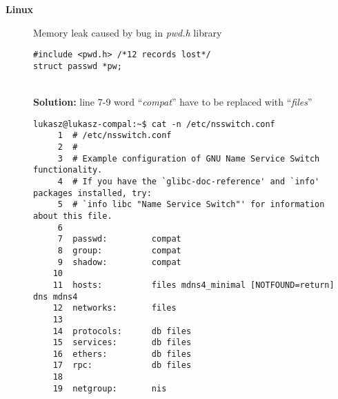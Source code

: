 \documentclass[a4paper]{article}
\begin{document}
\begin{description}
\item [{\bf Linux}] Memory leak caused by bug in {\itshape pwd.h} library
\begin{verbatim}
#include <pwd.h> /*12 records lost*/
struct passwd *pw;
\end{verbatim}
\\{\bf Solution:} line 7-9 word ``{\itshape compat}'' have to be replaced with ``{\itshape files}''
\begin{verbatim}
lukasz@lukasz-compal:~$ cat -n /etc/nsswitch.conf 
     1	# /etc/nsswitch.conf
     2	#
     3	# Example configuration of GNU Name Service Switch functionality.
     4	# If you have the `glibc-doc-reference' and `info' packages installed, try:
     5	# `info libc "Name Service Switch"' for information about this file.
     6	
     7	passwd:         compat
     8	group:          compat
     9	shadow:         compat
    10	
    11	hosts:          files mdns4_minimal [NOTFOUND=return] dns mdns4
    12	networks:       files
    13	
    14	protocols:      db files
    15	services:       db files
    16	ethers:         db files
    17	rpc:            db files
    18	
    19	netgroup:       nis
\end{verbatim}

\end{description}
\end{document}
